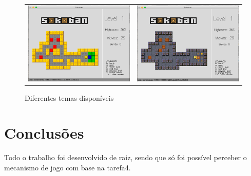 \documentclass[12pt,a4paper]{report}
\begin{document}
\begin{figure}[htb]
\centering
  \begin{tabular}{@{}cc@{}}
    \includegraphics[scale=0.30]{images/print6.png} &
    \includegraphics[scale=0.30]{images/print8.png}
  \end{tabular}
  \caption{Diferentes temas disponíveis}
\end{figure}


\chapter{Conclusões}
\label{sec:conclusao}

Todo o trabalho foi desenvolvido de raiz, sendo que só foi possível perceber o mecanismo de jogo com base na tarefa4. 
\end{document}
